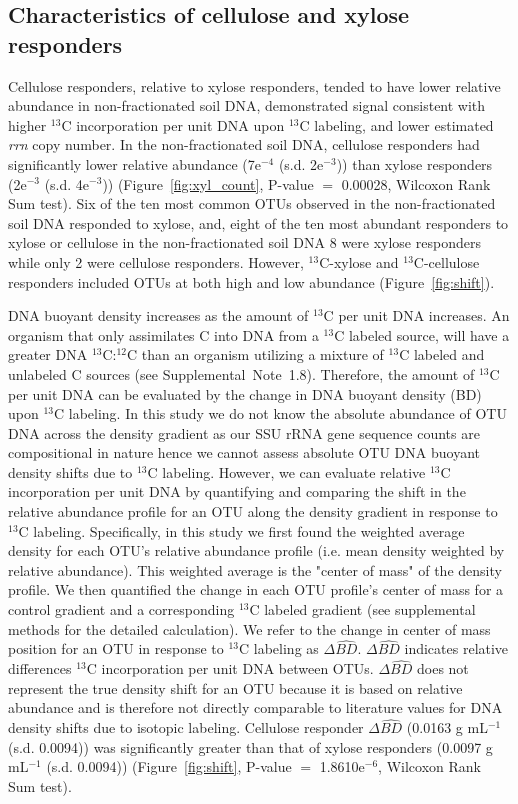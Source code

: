 \subsection{Characteristics of cellulose and xylose responders}
Cellulose responders, relative to xylose responders, tended to have lower
relative abundance in non-fractionated soil DNA, demonstrated signal consistent
with higher $^{13}$C incorporation per unit DNA upon $^{13}$C labeling, and
lower estimated \textit{rrn} copy number. In the
non-fractionated soil DNA, cellulose responders had significantly lower
relative abundance (7e$^{-4}$ (s.d. 2e$^{-3}$)) than xylose responders
(2e$^{-3}$ (s.d. 4e$^{-3}$)) (Figure~\ref{fig:xyl_count}, P-value $=$ 0.00028,
Wilcoxon Rank Sum test). Six of the ten most common OTUs observed in the
non-fractionated soil DNA responded to xylose, and, eight of the ten most
abundant responders to xylose or cellulose in the non-fractionated soil DNA
8 were xylose responders while only 2 were cellulose responders. However,
$^{13}$C-xylose and $^{13}$C-cellulose responders included OTUs at both high
and low abundance (Figure~\ref{fig:shift}).

DNA buoyant density increases as the amount of $^{13}$C per unit DNA increases.
An organism that only assimilates C into DNA from a $^{13}$C labeled source,
will have a greater DNA $^{13}$C:$^{12}$C than an
organism utilizing a mixture of $^{13}$C labeled and unlabeled C sources (see
Supplemental~Note~1.8). Therefore, the amount of $^{13}$C per unit DNA
can be evaluated by the change in DNA buoyant density (BD)
upon $^{13}$C labeling. In this study we do not know the absolute abundance of
OTU DNA across the density gradient as our SSU rRNA gene sequence counts are
compositional in nature hence we cannot assess absolute OTU DNA buoyant density
shifts due to $^{13}$C labeling. However, we can evaluate relative $^{13}$C
incorporation per unit DNA by quantifying and comparing the
shift in the relative abundance profile for an OTU along the density gradient
in response to $^{13}$C labeling. Specifically, in this study we first found
the weighted average density for each OTU's relative abundance profile (i.e.
mean density weighted by relative abundance). This weighted average is the
"center of mass" of the density profile. We then quantified the change in each
OTU profile's center of mass for a control gradient and a corresponding
$^{13}$C labeled gradient (see supplemental methods for the detailed
calculation). We refer to the change in center of mass position for an OTU in
response to $^{13}$C labeling as $\Delta\hat{BD}$. $\Delta\hat{BD}$ indicates
relative differences $^{13}$C incorporation per unit DNA between OTUs.
$\Delta\hat{BD}$ does not represent the true density shift for an OTU because
it is based on relative abundance and is therefore not directly comparable to
literature values for DNA density shifts due to isotopic labeling. Cellulose
responder $\Delta\hat{BD}$ (0.0163 g mL$^{-1}$ (s.d.
0.0094)) was significantly greater than that of xylose responders (0.0097
g mL$^{-1}$ (s.d. 0.0094)) (Figure~\ref{fig:shift}, P-value $=$ 1.8610e$^{-6}$,
Wilcoxon Rank Sum test). 

